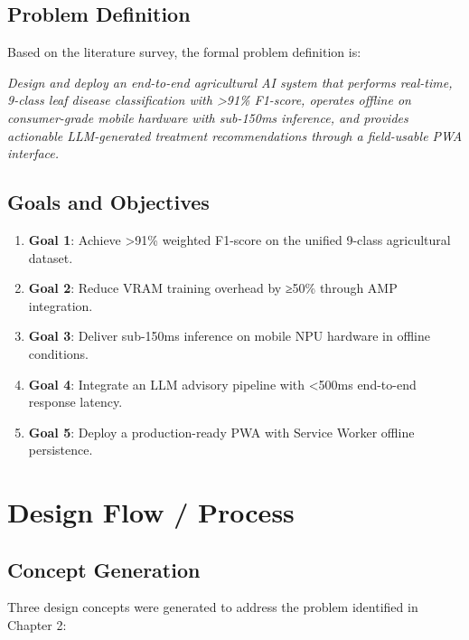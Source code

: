\documentclass[12pt,oneside]{report}
\begin{document}
\section{Problem Definition}
Based on the literature survey, the formal problem definition is:

\textit{Design and deploy an end-to-end agricultural AI system that performs real-time, 9-class leaf disease classification with >91\% F1-score, operates offline on consumer-grade mobile hardware with sub-150ms inference, and provides actionable LLM-generated treatment recommendations through a field-usable PWA interface.}

\section{Goals and Objectives}
\begin{enumerate}
    \item \textbf{Goal 1}: Achieve >91\% weighted F1-score on the unified 9-class agricultural dataset.
    \item \textbf{Goal 2}: Reduce VRAM training overhead by ≥50\% through AMP integration.
    \item \textbf{Goal 3}: Deliver sub-150ms inference on mobile NPU hardware in offline conditions.
    \item \textbf{Goal 4}: Integrate an LLM advisory pipeline with <500ms end-to-end response latency.
    \item \textbf{Goal 5}: Deploy a production-ready PWA with Service Worker offline persistence.
\end{enumerate}

\chapter{Design Flow / Process}

\section{Concept Generation}
Three design concepts were generated to address the problem identified in Chapter 2:
\end{document}
